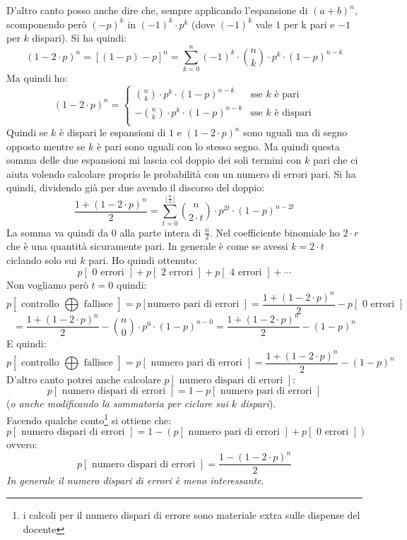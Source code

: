 \documentclass[a4paper,12pt, oneside]{book}
\begin{document}
D'altro canto posso anche dire che, sempre applicando l'espansione di $(a+b)^n$,
scomponendo però $(-p)^k$ in $(-1)^k\cdot p^k$ (dove $(-1)^k$ vale $1$ per k
pari e $-1$ per $k$ dispari). Si ha quindi:
\[(1-2\cdot p)^n=[(1-p)-p]^n=\sum_{k=0}^n(-1)^k\cdot {{n}\choose{k}}\cdot
  p^k\cdot(1-p)^{n-k}\]
Ma quindi ho:
\[(1-2\cdot p)^n=
  \begin{cases}
    {{n}\choose{k}}\cdot  p^k\cdot(1-p)^{n-k} &\mbox{sse $k$ è pari}\\
    -{{n}\choose{k}}\cdot  p^k\cdot(1-p)^{n-k} &\mbox{sse $k$ è dispari}\\
  \end{cases}
\]
Quindi se $k$ è dispari le espansioni di $1$ e $(1-2\cdot p)^n$ sono uguali ma
di segno opposto mentre se $k$ è pari sono uguali con lo stesso segno. Ma quindi
questa somma delle due espansioni mi lascia col doppio dei soli termini con $k$
pari che ci aiuta volendo calcolare proprio le probabilità con un numero di
errori pari. Si ha quindi, dividendo già per due avendo il discorso del doppio:
\[\frac{1+(1-2\cdot p)^n}{2}=\sum_{t=0}^{\lfloor \frac{n}{2}\rfloor}
  {{n}\choose{2\cdot t}}\cdot p^{2t}\cdot(1-p)^{n-2t}\]
La somma va quindi da 0 alla parte intera di $\frac{n}{2}$. Nel coefficiente
binomiale ho $2\cdot r$ che è una quantità sicuramente pari. In generale è come
se avessi $k=2\cdot t$ ciclando solo sui $k$ pari. Ho quindi ottenuto:
\[p[\mbox{ 0 errori }]+p[\mbox{ 2 errori }]+p[\mbox{ 4 errori }]+\cdots \]
Non vogliamo però $t=0$ quindi:
{\footnotesize{\[p[\mbox{ controllo }\bigoplus \mbox{ fallisce }]=p[\mbox{
        numero pari di errori }]=\frac{1+(1-2\cdot 
    p)^n}{2}-p[\mbox{ 0 errori }]\]}}
\[=\frac{1+(1-2\cdot p)^n}{2}-  {{n}\choose{0}}\cdot
  p^{0}\cdot(1-p)^{n-0}=\frac{1+(1-2\cdot p)^n}{2}-(1-p)^n\]
E quindi:
{\small{\[p[\mbox{ controllo }\bigoplus \mbox{ fallisce }]=p[\mbox{ numero pari
        di errori }]=\frac{1+(1-2\cdot p)^n}{2}-(1-p)^n\]}}
D'altro canto potrei anche calcolare $p[\mbox{ numero dispari di errori }]$:
\[p[\mbox{ numero dispari di errori }]=1-p[\mbox{ numero pari di errori }]\]
(\textit{o anche modificando la sommatoria per ciclare sui $k$ dispari}).\\
Facendo qualche conto\footnote{i calcoli
  per il numero dispari di errore sono materiale extra sulle dispense del
  docente} si ottiene che: 
\[p[\mbox{ numero dispari di errori }]=1-(p[\mbox{ numero pari di errori
  }]+p[\mbox{ 0 errori }])\]
ovvero:
\[p[\mbox{ numero dispari di errori }]=\frac{1-(1-2\cdot p)^n}{2}\]
\textit{In generale il numero dispari di errori è meno interessante}.\\
\end{document}
